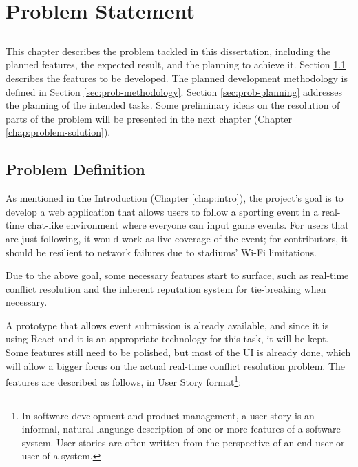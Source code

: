 \chapter{Problem Statement}\label{chap:problem}

\section*{}

This chapter describes the problem tackled in this dissertation, including the planned features, the expected result, and the planning to achieve it. Section \ref{sec:prob-def} describes the features to be developed. The planned development methodology is defined in Section \ref{sec:prob-methodology}. Section \ref{sec:prob-planning} addresses the planning of the intended tasks. Some preliminary ideas on the resolution of parts of the problem will be presented in the next chapter (Chapter \ref{chap:problem-solution}).

\section{Problem Definition}\label{sec:prob-def}

As mentioned in the Introduction (Chapter \ref{chap:intro}), the project's goal is to develop a web application that allows users to follow a sporting event in a real-time chat-like environment where everyone can input game events. For users that are just following, it would work as live coverage of the event; for contributors, it should be resilient to network failures due to stadiums' Wi-Fi limitations.

Due to the above goal, some necessary features start to surface, such as real-time conflict resolution and the inherent reputation system for tie-breaking when necessary. 

A prototype that allows event submission is already available, and since it is using React and it is an appropriate technology for this task, it will be kept. Some features still need to be polished, but most of the UI is already done, which will allow a bigger focus on the actual real-time conflict resolution problem. The features are described as follows, in User Story format\footnote{In software development and product management, a user story is an informal, natural language description of one or more features of a software system. User stories are often written from the perspective of an end-user or user of a system.}:

